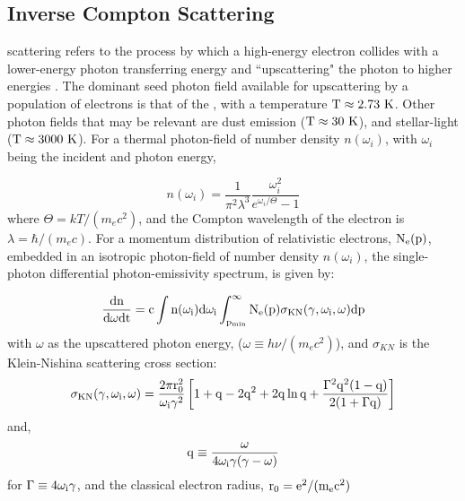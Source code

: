 \subsection{Inverse Compton Scattering}\label{gamAstr:IC}

\ic{} scattering refers to the process by which a high-energy electron collides with a lower-energy photon transferring energy and ``upscattering" the photon to higher energies \citep{Blumenthal70}. The dominant seed photon field available for upscattering by a population of electrons is that of the \cmb{}, with a temperature ${\rm T \approx 2.73~K}$. Other photon fields that may be relevant are \fir{} dust emission (${\rm T \approx 30~K}$), and \nir{} stellar-light (${\rm T \approx 3000~K}$). For a thermal photon-field of number density $n(\omega_i)$, with $\omega_i$ being the incident and photon energy,

\begin{equation}
n(\omega_i) = 
\frac{1}{\pi^2\lambda^3} 
\frac{\omega_i^2}{e^{\omega_i/\Theta} -1}
\end{equation}
where  $\Theta=kT/(m_e c^2)$, and the Compton wavelength of the electron is $\lambda=\hbar/(m_e c)$.
For a momentum distribution of relativistic electrons, ${\rm N_e(p)}$, embedded in an isotropic photon-field of number density $n(\omega_i)$, the single-photon differential photon-emissivity spectrum,  is given by:

\begin{equation}
{\rm \frac{dn}{d\omega dt} = 
c \int  n(\omega_i)d \omega_i
\int_{p_{min}}^\infty 
N_e(p)  \sigma_{KN}(\gamma,\omega_i,\omega)dp}
\end{equation}
with $\omega$ as the upscattered photon energy, ($\omega\equiv h\nu/(m_e c^2)$), and $\sigma_{KN}$ is the Klein-Nishina scattering  cross section:
\begin{equation}
{\rm \sigma_{KN}(\gamma,\omega_i,\omega) = \frac{2\pi r_0^2}{\omega_i \gamma^2}
\left[
1 + q - 2q^2 + 2q\ln q + \frac{\Gamma^2 q^2 (1-q)}{2(1+\Gamma q)}
\right]}
\end{equation}
and,
\begin{equation}
{\rm q \equiv \frac{\omega}{4 \omega_i \gamma (\gamma-\omega)}}
\end{equation}
for ${\rm \Gamma \equiv 4\omega_i \gamma}$, and the classical electron radius, ${\rm r_0 = e^2/(m_e c^2)}$




